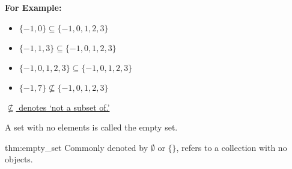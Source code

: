 \noindent
\textbf{For Example:}
\begin{itemize}
    \item $\{-1, 0\} \subseteq \{-1, 0, 1, 2, 3\}$
    \item $\{-1, 1, 3\} \subseteq \{-1, 0, 1, 2, 3\}$
    \item $\{-1, 0, 1, 2, 3\} \subseteq \{-1, 0, 1, 2, 3\}$
    \item $\{-1, 7\} \not\subseteq \{-1, 0, 1, 2, 3\}$
\end{itemize}

\underline{$\not\subseteq$ denotes `not a subset of.'}

\vspace{1em}

\noindent
A set with no elements is called the empty set.
\begin{theo}{thm:empty_set}
    Commonly denoted by $\emptyset$ or $\{\}$, refers to a collection with no objects.
\end{theo}


